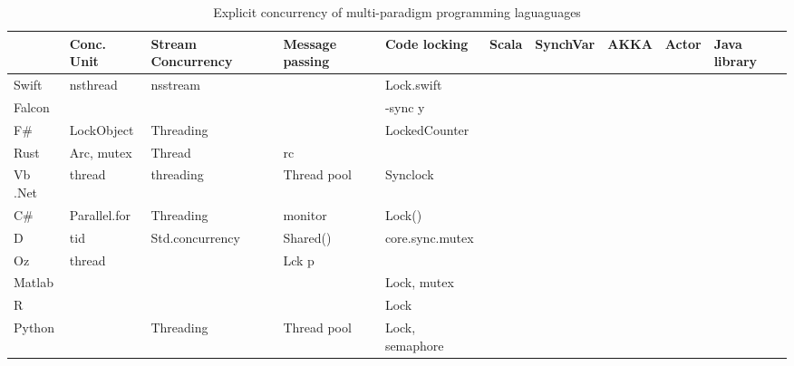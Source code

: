 \documentclass{sig-alternate}
\begin{document}
	
	\begin{table*}[]
		\centering
		\caption{Explicit concurrency of multi-paradigm programming laguaguages}
		
		\begin{tabular}{|l|l|l|l|l|}
			\hline
			&Conc. Unit & Stream Concurrency & Message passing            & Code locking &                \hline
			Scala                     & SynchVar           & AKKA                             & Actor        & Java library    \\ \hline
			Swift                & nsthread           & nsstream                   &                & Lock.swift      \\ \hline
			Falcon                      &                 &                         &           & -sync y         \\ \hline
			F\#                             & LockObject         & Threading                  &           & LockedCounter   \\ \hline
			Rust                & Arc, mutex         & Thread        & rc           &                 \\ \hline
			Vb .Net            & thread             & threading                  & Thread pool      & Synclock        \\ \hline
			C\#                       & Parallel.for       & Threading               & monitor      & Lock()          \\ \hline
			D                & tid                & Std.concurrency & Shared()     & core.sync.mutex \\ \hline
			Oz                & thread                           &                  & Lck p  &        \\ \hline
			Matlab              &                                &               &           & Lock, mutex     \\ \hline
			R               &                                     &               &           & Lock            \\ \hline
			Python                       &                 & Threading                          & Thread pool  & Lock, semaphore \\ \hline
		\end{tabular}
	\end{table*}
	
	
	
	
	
\end{document}
